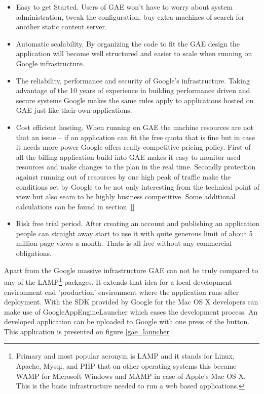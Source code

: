 \begin{itemize}
\item{Easy to get Started. Users of GAE won't have to worry about system administration, tweak the configuration, buy extra machines of search for another static content server.}
\item{Automatic scalability. By organizing the code to fit the GAE design the application will become well structured and easier to scale when running on Google infrastructure.} 
\item{The reliability, performance and security of Google's infrastructure. Taking advantage of the 10 years of experience in building performance driven and secure systems Google makes the same rules apply to applications hosted on GAE just like their own applications.}
\item{Cost efficient hosting. When running on GAE the machine resources are not that an issue -- if an application can fit the free quota that is fine but in case it needs more power Google offers really competitive pricing policy. First of all the billing application build into GAE makes it easy to monitor used resources and make changes to the plan in the real time. Secondly protection against running out of resources by one high peak of traffic make the conditions set by Google to be not only interesting from the technical point of view but also seam to be highly business competitive. Some additional calculations can be found in section~\ref{}}
\item{Risk free trial period. After creating an account and publishing an application people can straight away start to use it with quite generous limit of about 5 million page views a month. Thats is all free without any commercial obligations.}
\end{itemize}
Apart from the Google massive infrastructure GAE can not be truly compared to any of the LAMP\footnote{Primary and most popular acronym is LAMP and it stands for Linux, Apache, Mysql, and PHP that on other operating systems this became WAMP for Microsoft Windows and MAMP in case of Apple's Mac OS X. This is the basic infrastructure needed to run a web based applications.} packages. It extends that idea for a local development environment end 'production' environment where the application runs after deployment. With the SDK provided by Google for the Mac OS X developers can make use of GoogleAppEngineLauncher which eases the development process. An developed application can be uploaded to Google with one press of the button. This application is presented on figure \ref{gae_launcher}.
